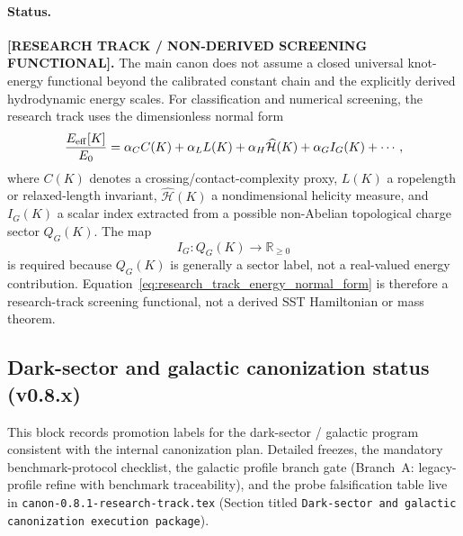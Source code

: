 \documentclass[11pt]{article}
\theoremstyle{definition}
\theoremstyle{plain}
\theoremstyle{remark}
\begin{document}
        \paragraph{Status.}
        \textbf{[RESEARCH TRACK / NON-DERIVED SCREENING FUNCTIONAL].}
        The main canon does not assume a closed universal knot-energy functional beyond the calibrated constant chain and the explicitly derived hydrodynamic energy scales.  For classification and numerical screening, the research track uses the dimensionless normal form
        \begin{equation}
            \frac{E_{\rm eff}[K]}{E_0}
            =
            \alpha_C C(K)
            +\alpha_L L(K)
            +\alpha_H\widehat{\mathcal H}(K)
            +\alpha_G I_G(K)
            +\cdots,
            \label{eq:research_track_energy_normal_form}
        \end{equation}
        where $C(K)$ denotes a crossing/contact-complexity proxy, $L(K)$ a ropelength or relaxed-length invariant, $\widehat{\mathcal H}(K)$ a nondimensional helicity measure, and $I_G(K)$ a scalar index extracted from a possible non-Abelian topological charge sector $Q_G(K)$.  The map
        \begin{equation}
            I_G:Q_G(K)\longrightarrow \mathbb R_{\ge 0}
        \end{equation}
        is required because $Q_G(K)$ is generally a sector label, not a real-valued energy contribution.  Equation~\eqref{eq:research_track_energy_normal_form} is therefore a research-track screening functional, not a derived SST Hamiltonian or mass theorem.

    \subsection{Dark-sector and galactic canonization status (v0.8.x)}
        \label{sec:dark-canonicalization-status}

        This block records promotion labels for the dark-sector / galactic program consistent with the internal canonization plan. Detailed freezes, the mandatory benchmark-protocol checklist, the galactic profile branch gate (Branch~A: legacy-profile refine with benchmark traceability), and the probe falsification table live in \texttt{canon-0.8.1-research-track.tex} (Section titled \texttt{Dark-sector and galactic canonization execution package}).
\end{document}
